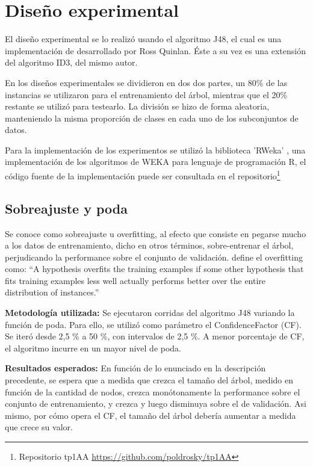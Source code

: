 \section{Diseño experimental}

El diseño experimental se lo realizó usando el algoritmo J48, el cual es una implementación de \cite{hall2009weka}
desarrollado por Ross Quinlan. Éste a su vez es una extensión del algoritmo ID3, del mismo autor.

En los diseños experimentales se dividieron en dos dos partes, un 80\% de las instancias
se utilizaron para el entrenamiento del árbol, mientras que el 20\% restante se utilizó para
testearlo. La división se hizo de forma aleatoria, manteniendo la misma proporción de clases en cada
uno de los subconjuntos de datos.

Para la implementación de los experimentos se utilizó la biblioteca 'RWeka' \cite{rweka}, una implementación de los algoritmos de 
WEKA para lenguaje de programación R, el código fuente de la implementación puede ser consultada en el repositorio\footnote{
Repositorio tp1AA \url{https://github.com/poldrosky/tp1AA}}

\subsection{Sobreajuste y poda}

Se conoce como sobreajuste u overfitting, al efecto que consiste en pegarse mucho a los 
datos de entrenamiento, dicho en otros términos, sobre-entrenar el árbol,
perjudicando la performance sobre el conjunto de validación. \cite{mitchell1997machine}
define el overfitting como: ``A hypothesis overfits the training examples if some other hypothesis that
fits training examples less well actually performs better over the entire distribution of instances.''

\textbf{Metodología utilizada:} Se ejecutaron corridas del algoritmo J48 variando la función de
poda. Para ello, se utilizó como parámetro el ConfidenceFactor (CF). Se iteró desde 2,5 \%
a 50 \%, con intervalos de 2,5 \%. A menor porcentaje de CF, el algoritmo incurre en un mayor nivel
de poda. 

\textbf{Resultados esperados:} En función de lo enunciado en la descripción precedente, se
espera que a medida que crezca el tamaño del árbol, medido en función de la cantidad de
nodos, crezca monótonamente la performance sobre el conjunto de entrenamiento, y crezca y
luego disminuya sobre el de validación. Asi mismo, por cómo opera el CF, el tamaño del
árbol debería aumentar a medida que crece su valor.

